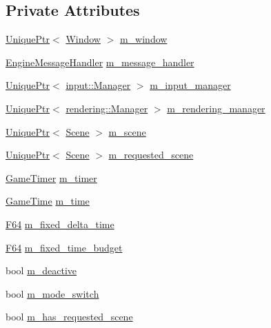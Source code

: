 \subsection*{Private Attributes}
\begin{DoxyCompactItemize}
\item 
\mbox{\hyperlink{namespacemage_a3316d7143a973e37adf1110f2e80ca31}{Unique\+Ptr}}$<$ \mbox{\hyperlink{classmage_1_1_window}{Window}} $>$ \mbox{\hyperlink{classmage_1_1_engine_a8b710b9c37a48caad05896102c4b6980}{m\+\_\+window}}
\item 
\mbox{\hyperlink{classmage_1_1_engine_message_handler}{Engine\+Message\+Handler}} \mbox{\hyperlink{classmage_1_1_engine_a8359f22543fa6e39c948411e3023c397}{m\+\_\+message\+\_\+handler}}
\item 
\mbox{\hyperlink{namespacemage_a3316d7143a973e37adf1110f2e80ca31}{Unique\+Ptr}}$<$ \mbox{\hyperlink{classmage_1_1input_1_1_manager}{input\+::\+Manager}} $>$ \mbox{\hyperlink{classmage_1_1_engine_a33db04e6d27802054769ff6a30911261}{m\+\_\+input\+\_\+manager}}
\item 
\mbox{\hyperlink{namespacemage_a3316d7143a973e37adf1110f2e80ca31}{Unique\+Ptr}}$<$ \mbox{\hyperlink{classmage_1_1rendering_1_1_manager}{rendering\+::\+Manager}} $>$ \mbox{\hyperlink{classmage_1_1_engine_ae870ec5b532a21112500f0f0f03e9b55}{m\+\_\+rendering\+\_\+manager}}
\item 
\mbox{\hyperlink{namespacemage_a3316d7143a973e37adf1110f2e80ca31}{Unique\+Ptr}}$<$ \mbox{\hyperlink{classmage_1_1_scene}{Scene}} $>$ \mbox{\hyperlink{classmage_1_1_engine_a2d4037208a0529838c81ccea08c9de11}{m\+\_\+scene}}
\item 
\mbox{\hyperlink{namespacemage_a3316d7143a973e37adf1110f2e80ca31}{Unique\+Ptr}}$<$ \mbox{\hyperlink{classmage_1_1_scene}{Scene}} $>$ \mbox{\hyperlink{classmage_1_1_engine_a45160eecbdcbebcf269436505342db54}{m\+\_\+requested\+\_\+scene}}
\item 
\mbox{\hyperlink{classmage_1_1_game_timer}{Game\+Timer}} \mbox{\hyperlink{classmage_1_1_engine_a360589e71a3d081c6a748aa283d1526d}{m\+\_\+timer}}
\item 
\mbox{\hyperlink{classmage_1_1_game_time}{Game\+Time}} \mbox{\hyperlink{classmage_1_1_engine_ab5f56d65109d276dd49ba43c504bbd26}{m\+\_\+time}}
\item 
\mbox{\hyperlink{namespacemage_ad26233bbec640deda836e572c1a23708}{F64}} \mbox{\hyperlink{classmage_1_1_engine_a95557e1b6cba52b393c94d80d80bea4c}{m\+\_\+fixed\+\_\+delta\+\_\+time}}
\item 
\mbox{\hyperlink{namespacemage_ad26233bbec640deda836e572c1a23708}{F64}} \mbox{\hyperlink{classmage_1_1_engine_ad46dd72279d9d86b96d1b907575765e9}{m\+\_\+fixed\+\_\+time\+\_\+budget}}
\item 
bool \mbox{\hyperlink{classmage_1_1_engine_ab8a4b0157403708ae7d1d018a95b4c63}{m\+\_\+deactive}}
\item 
bool \mbox{\hyperlink{classmage_1_1_engine_aa5cb2e0b7bb2c4a9020e79ab832ee221}{m\+\_\+mode\+\_\+switch}}
\item 
bool \mbox{\hyperlink{classmage_1_1_engine_a96089c745442208679ea2e18cc6a6097}{m\+\_\+has\+\_\+requested\+\_\+scene}}
\end{DoxyCompactItemize}


